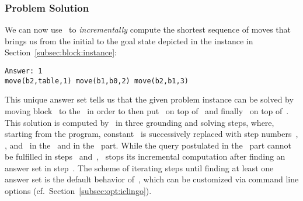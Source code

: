 \subsubsection{Problem Solution}\label{subsec:block:solution}

We can now use \iclingo\ to \emph{incrementally} compute the shortest
sequence of moves that brings us from the initial to the goal state
depicted in the instance in Section~\ref{subsec:block:instance}:%
%
\begin{lstlisting}[numbers=none]
Answer: 1
move(b2,table,1) move(b1,b0,2) move(b2,b1,3)
\end{lstlisting}
%
This unique answer set tells us that the given problem instance can
be solved by moving block~ to the~ in order to
then put~ on top of~ and finally~ on top of~.
This solution is computed by \iclingo\ in three grounding and solving steps,
where, starting from the  program, constant~
is successively replaced with step numbers~, , and~
in the~ and in the~ part.
While the query postulated in the~ part cannot be
fulfilled in steps~ and~, \iclingo\ 
stops its incremental computation after finding an answer set in step~.
The scheme of iterating steps until finding at least one answer set
is the default behavior of~\iclingo,
which can be customized via command line options
(cf.\ Section~\ref{subsec:opt:iclingo}).

